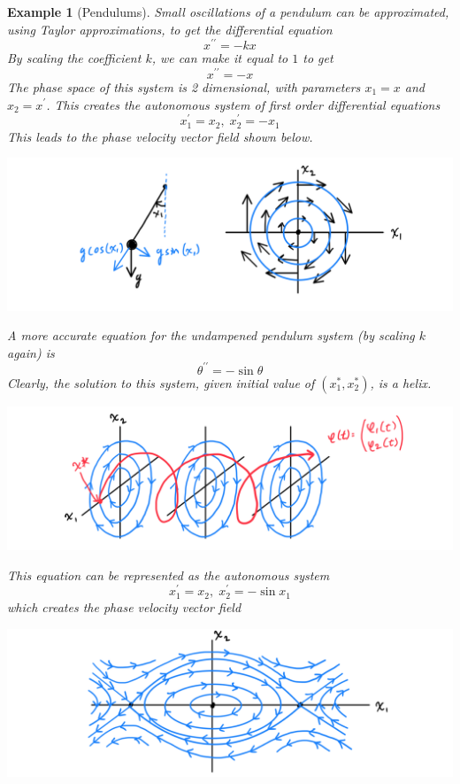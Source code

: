 \documentclass{article}
\newtheorem{example}{Example}[section]
\theoremstyle{remark}
\theoremstyle{definition}
\begin{document}
      \begin{example}[Pendulums]
      Small oscillations of a pendulum can be approximated, using Taylor approximations, to get the differential equation 
      \[x^{\prime \prime} = - k x\]
      By scaling the coefficient $k$, we can make it equal to $1$ to get
      \[x^{\prime \prime} = -x\]
      The phase space of this system is 2 dimensional, with parameters $x_1 = x$ and $x_2 = x^\prime$. This creates the autonomous system of first order differential equations
      \[x^\prime_1 = x_2, \; x_2^\prime = -x_1\]
      This leads to the phase velocity vector field shown below. 
      \begin{center}
          \includegraphics[scale=0.25]{img/Undampened_Simple_Pendulum.PNG}
      \end{center}
      A more accurate equation for the undampened pendulum system (by scaling $k$ again) is 
      \[\theta^{\prime \prime} = -\sin{\theta}\]
      Clearly, the solution to this system, given initial value of $(x_1^*, x_2^*)$, is a helix.
      \begin{center}
          \includegraphics[scale=0.25]{img/Helix_Solution.PNG}
      \end{center}
      This equation can be represented as the autonomous system
      \[x_1^\prime = x_2, \; x_2^\prime = - \sin{x_1} \]
      which creates the phase velocity vector field
      \begin{center}
          \includegraphics[scale=0.25]{img/Undampened_Accurate_Pendulum.PNG}
      \end{center}
      \end{example}
\end{document}
